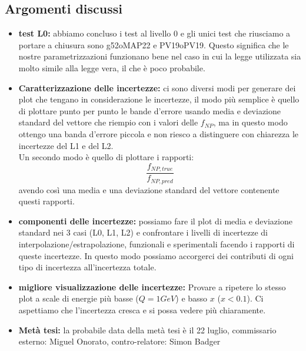 \documentclass{article}
\begin{document}
\subsection{Argomenti discussi}
\begin{itemize}
    \item \textbf{test L0: } abbiamo concluso i test al livello 0 e gli unici test che riusciamo a portare a chiusura sono g52oMAP22 e PV19oPV19. Questo significa che le nostre parametrizzazioni funzionano bene nel caso in cui la legge utilizzata sia molto simile alla legge vera, il che è poco probabile.
    \item \textbf{Caratterizzazione delle incertezze: } ci sono diversi modi per generare dei plot che tengano in considerazione le incertezze, il modo più semplice è quello di plottare punto per punto le bande d'errore usando media e deviazione standard del vettore che riempio con i valori delle $f_{NP}$, ma in questo modo ottengo una banda d'errore piccola e non riesco a distinguere con chiarezza le incertezze del L1 e del L2.\\ Un secondo modo è quello di plottare i rapporti:
    \[ \frac{f_{NP, true}}{f_{NP, pred}}\] avendo così una media e una deviazione standard del vettore contenente questi rapporti.
    \item \textbf{componenti delle incertezze: } possiamo fare il plot di media e deviazione standard nei 3 casi (L0, L1, L2) e confrontare i livelli di incertezze di interpolazione/estrapolazione, funzionali e sperimentali facendo i rapporti di queste incertezze. In questo modo possiamo accorgerci dei contributi di ogni tipo di incertezza all'incertezza totale. 
    \item \textbf{migliore visualizzazione delle incertezze: } Provare a ripetere lo stesso plot a scale di energie più basse ($Q = 1GeV$) e basso $x$ ($x < 0.1$). Ci aspettiamo che l'incertezza cresca e si possa vedere più chiaramente.
    \item  \textbf{Metà tesi: } la probabile data della metà tesi è il 22 luglio, commissario esterno: Miguel Onorato, contro-relatore: Simon Badger
\end{itemize}
\end{document}
